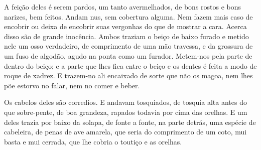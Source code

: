 \documentclass[12pt,a4paper]{article}
\begin{document}
A feição deles é serem pardos, um tanto avermelhados, de bons rostos e
bons narizes, bem feitos. Andam nus, sem cobertura alguma. Nem fazem mais caso
de encobrir ou deixa de encobrir suas vergonhas do que de mostrar a cara. Acerca
disso são de grande inocência. Ambos traziam o beiço de baixo furado e metido nele
um osso verdadeiro, de comprimento de uma mão travessa, e da grossura de um
fuso de algodão, agudo na ponta como um furador. Metem-nos pela parte de dentro
do beiço; e a parte que lhes fica entre o beiço e os dentes é feita a modo de roque
de xadrez. E trazem-no ali encaixado de sorte que não os magoa, nem lhes põe
estorvo no falar, nem no comer e beber.

Os cabelos deles são corredios. E andavam tosquiados, de tosquia alta antes
do que sobre-pente, de boa grandeza, rapados todavia por cima das orelhas. E um
deles trazia por baixo da solapa, de fonte a fonte, na parte detrás, uma espécie de
cabeleira, de penas de ave amarela, que seria do comprimento de um coto, mui
basta e mui cerrada, que lhe cobria o toutiço e as orelhas. 
\end{document}
